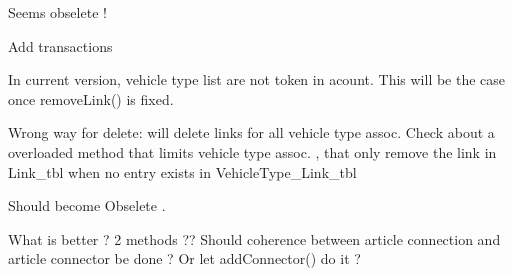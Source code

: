 \begin{DoxyRefList}
\item[\label{todo__todo000093}%
\hypertarget{todo__todo000093}{}%
Class \hyperlink{classmdt_basic_state_machine}{mdt\-Basic\-State\-Machine$<$ S $>$} ]Seems obselete !  
\item[\label{todo__todo000054}%
\hypertarget{todo__todo000054}{}%
Member \hyperlink{classmdt_cl_direct_link_aa7a155c3bf99b91e2d9cff85e93f332b}{mdt\-Cl\-Direct\-Link\-:\-:add\-Links\-By\-Unit\-Connector} (const Q\-Variant unit\-Connector\-Id\-S, const Q\-Variant unit\-Connector\-Id\-E, \hyperlink{classmdt_cl_path_graph}{mdt\-Cl\-Path\-Graph} $\ast$graph)]Add transactions  
\item[\label{todo__todo000056}%
\hypertarget{todo__todo000056}{}%
Member \hyperlink{classmdt_cl_link_ac32bfef9f23b431ea4d3d546e6c21361}{mdt\-Cl\-Link\-:\-:disconnect\-Connectors} (const Q\-Variant \&start\-Unit\-Connector\-Id, const Q\-Variant \&end\-Unit\-Connector\-Id, const Q\-List$<$ Q\-Variant $>$ \&start\-Vehicle\-Type\-Id\-List, const Q\-List$<$ Q\-Variant $>$ \&end\-Vehicle\-Type\-Id\-List)]In current version, vehicle type list are not token in acount. This will be the case once remove\-Link() is fixed.  
\item[\label{todo__todo000055}%
\hypertarget{todo__todo000055}{}%
Member \hyperlink{classmdt_cl_link_a865c0cee1fab1c9209d139dcd70f9fbd}{mdt\-Cl\-Link\-:\-:remove\-Link} (const Q\-Variant \&unit\-Connection\-Start\-Id, const Q\-Variant \&unit\-Connection\-End\-Id, bool handle\-Transaction=true)]Wrong way for delete\-: will delete links for all vehicle type assoc. Check about a overloaded method that limits vehicle type assoc. , that only remove the link in Link\-\_\-tbl when no entry exists in Vehicle\-Type\-\_\-\-Link\-\_\-tbl  
\item[\label{todo__todo000057}%
\hypertarget{todo__todo000057}{}%
Member \hyperlink{classmdt_cl_path_graph_a63ddfb9e8d64041ad17c992eac172a8a}{mdt\-Cl\-Path\-Graph\-:\-:last\-Error\-Message} () const ]Should become Obselete .  
\item[\label{todo__todo000058}%
\hypertarget{todo__todo000058}{}%
Member \hyperlink{classmdt_cl_unit_a9aa3d52f4e6d79fa003d96e04be8223e}{mdt\-Cl\-Unit\-:\-:add\-Connection\-Data\-List\-From\-Article\-Connection\-Id\-List} (\hyperlink{classmdt_cl_unit_connector_data}{mdt\-Cl\-Unit\-Connector\-Data} \&data, const Q\-List$<$ Q\-Variant $>$ \&article\-Connection\-Id\-List, bool copy\-Contact\-Name)]What is better ? 2 methods ?? Should coherence between article connection and article connector be done ? Or let add\-Connector() do it ? 

\end{DoxyRefList}
